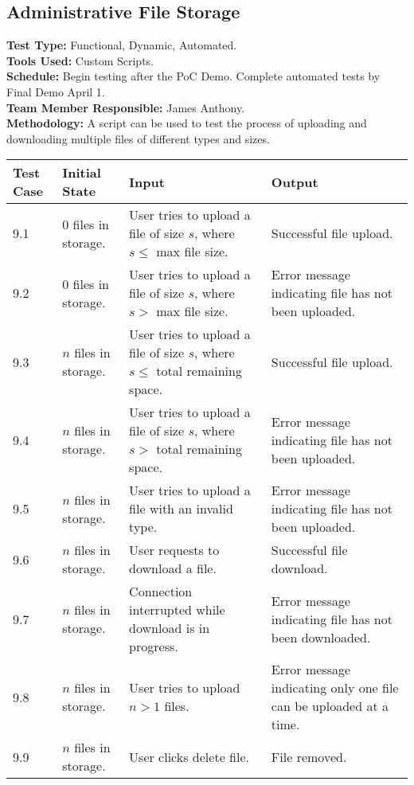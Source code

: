 \documentclass[12pt]{article}
\begin{document}
\subsection{Administrative File Storage}
\textbf{Test Type:} Functional, Dynamic, Automated. \\
\textbf{Tools Used:} Custom Scripts. \\
\textbf{Schedule:} Begin testing after the PoC Demo. Complete automated tests by Final Demo April 1. \\
\textbf{Team Member Responsible:} James Anthony. \\
\textbf{Methodology:} A script can be used to test the process of uploading and downloading multiple files of different types and sizes.

\begin{longtable}{|p{2cm}|p{3cm}|p{5cm}|p{5cm}|}
\hline
\textbf{Test Case} & \textbf{Initial State} & \textbf{Input} & \textbf{Output} \\ \hline
9.1 & 0 files in storage. & User tries to upload a file of size $s$, where $s \le$ max file size. & Successful file upload.\\
\hline
9.2 & 0 files in storage. & User tries to upload a file of size $s$, where $s >$ max file size. & Error message indicating file has not been uploaded.\\
\hline
9.3 & $n$ files in storage. & User tries to upload a file of size $s$, where $s \le$ total remaining space. & Successful file upload.\\
\hline
9.4 & $n$ files in storage. & User tries to upload a file of size $s$, where $s >$ total remaining space. & Error message indicating file has not been uploaded.\\
\hline
9.5 & $n$ files in storage. & User tries to upload a file with an invalid type. & Error message indicating file has not been uploaded.\\
\hline
9.6 & $n$ files in storage. & User requests to download a file. & Successful file download.\\
\hline
9.7 & $n$ files in storage. & Connection interrupted while download is in progress. & Error message indicating file has not been downloaded.\\
\hline
9.8 & $n$ files in storage. & User tries to upload  $n > 1$ files. & Error message indicating only one file can be uploaded at a time.\\
\hline
9.9 & $n$ files in storage. & User clicks delete file. & File removed. \\
\hline
\end{longtable}
\end{document}
